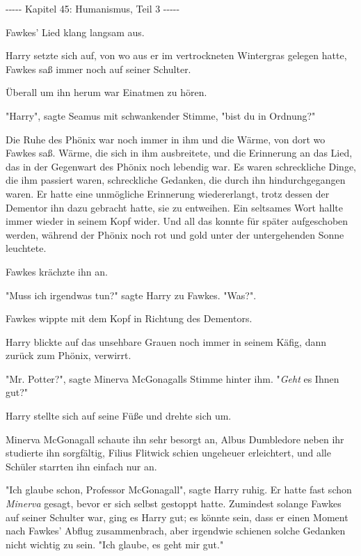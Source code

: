 

\hypertarget{humanismus-teil-3}{%

-\/-\/-\/-\/- Kapitel 45: Humanismus, Teil 3 -\/-\/-\/-\/-

Fawkes' Lied klang langsam aus.

Harry setzte sich auf, von wo aus er im vertrockneten Wintergras gelegen hatte, Fawkes saß immer noch auf seiner Schulter.

Überall um ihn herum war Einatmen zu hören.

"Harry", sagte Seamus mit schwankender Stimme, "bist du in Ordnung?"

Die Ruhe des Phönix war noch immer in ihm und die Wärme, von dort wo Fawkes saß. Wärme, die sich in ihm ausbreitete, und die Erinnerung an das Lied, das in der Gegenwart des Phönix noch lebendig war. Es waren schreckliche Dinge, die ihm passiert waren, schreckliche Gedanken, die durch ihn hindurchgegangen waren. Er hatte eine unmögliche Erinnerung wiedererlangt, trotz dessen der Dementor ihn dazu gebracht hatte, sie zu entweihen. Ein seltsames Wort hallte immer wieder in seinem Kopf wider. Und all das konnte für später aufgeschoben werden, während der Phönix noch rot und gold unter der untergehenden Sonne leuchtete.

Fawkes krächzte ihn an.

"Muss ich irgendwas tun?" sagte Harry zu Fawkes. "Was?".

Fawkes wippte mit dem Kopf in Richtung des Dementors.

Harry blickte auf das unsehbare Grauen noch immer in seinem Käfig, dann zurück zum Phönix, verwirrt.

"Mr. Potter?", sagte Minerva McGonagalls Stimme hinter ihm. "\emph{Geht} es Ihnen gut?"

Harry stellte sich auf seine Füße und drehte sich um.

Minerva McGonagall schaute ihn sehr besorgt an, Albus Dumbledore neben ihr studierte ihn sorgfältig, Filius Flitwick schien ungeheuer erleichtert, und alle Schüler starrten ihn einfach nur an.

"Ich glaube schon, Professor McGonagall", sagte Harry ruhig. Er hatte fast schon \emph{Minerva} gesagt, bevor er sich selbst gestoppt hatte. Zumindest solange Fawkes auf seiner Schulter war, ging es Harry gut; es könnte sein, dass er einen Moment nach Fawkes' Abflug zusammenbrach, aber irgendwie schienen solche Gedanken nicht wichtig zu sein. "Ich glaube, es geht mir gut."

}
